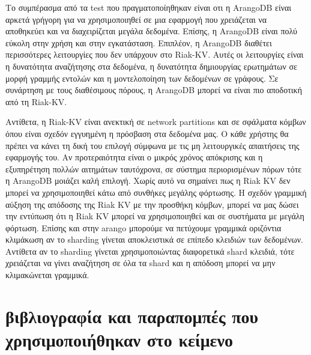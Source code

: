 \documentclass[conference]{IEEEtran}
\begin{document}


Το συμπέρασμα από τα test που πραγματοποίηθηκαν είναι οτι η ArangoDB είναι
αρκετά γρήγορη για να χρησιμοποιηθεί σε μια εφαρμογή που χρειάζεται να αποθηκεύει
και να διαχειρίζεται μεγάλα δεδομένα. Επίσης, η ArangoDB είναι πολύ εύκολη στην
χρήση και στην εγκατάσταση. Επιπλέον, η ArangoDB διαθέτει περισσότερες λειτουργίες
που δεν υπάρχουν στο Riak-KV.
Αυτές οι λειτουργίες είναι η δυνατότητα
αναζήτησης στα δεδομένα, η δυνατότητα δημιουργίας ερωτημάτων σε μορφή
γραμμής εντολών και η μοντελοποίηση των δεδομένων σε γράφους. 
Σε συνάρτηση με τους διαθέσιμους πόρους, η ArangoDB μπορεί να
είναι πιο αποδοτική από τη  Riak-KV. 

Αντίθετα, η Riak-KV είναι ανεκτική σε 
network partitions και σε σφάλματα κόμβων όπου είναι σχεδόν εγγυημένη η πρόσβαση
στα δεδομένα μας. Ο κάθε χρήστης θα πρέπει να κάνει τη δική του επιλογή 
σύμφωνα με τις μη λειτουργικές απαιτήσεις της εφαρμογής του. Αν προτεραιότητα είναι ο μικρός 
χρόνος απόκρισης και η εξυπηρέτηση πολλών αιτημάτων ταυτόχρονα, σε σύστημα περιορισμένων πόρων
τότε η ArangoDB μοιάζει καλή επιλογή. Χωρίς αυτό να σημαίνει πως η Riak KV δεν μπορεί να χρησιμοποιηθεί
κάτω από συνθήκες μεγάλης φόρτωσης. Η σχεδόν γραμμική αύξηση της απόδοσης της Riak KV
με την προσθήκη κόμβων, μπορεί να μας δώσει την εντύπωση ότι η Riak KV μπορεί να χρησιμοποιηθεί και σε
συστήματα με μεγάλη φόρτωση. 
Επίσης και στην arango μπορούμε να πετύχουμε γραμμικά οριζόντια κλιμάκωση αν το 
sharding γίνεται αποκλειστικά σε επίπεδο κλειδιών των δεδομένων. Αντίθετα αν το sharding γίνεται χρησιμοποιώντας 
διαφορετικά shard κλειδιά, τότε χρειάζεται να γίνει αναζήτηση σε όλα τα shard και η απόδοση 
μπορεί να μην κλιμακώνεται γραμμικά.
\section{βιβλιογραφία και παραπομπές που χρησιμοποιήθηκαν στο κείμενο}
\end{document}
